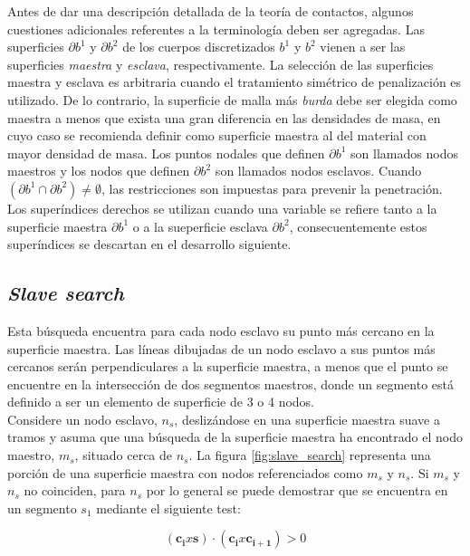 Antes de dar una descripción detallada de la teoría de contactos, algunos cuestiones adicionales 
referentes a la terminología deben ser agregadas. Las superficies $\partial b^1$ y $\partial b^2$ 
de los cuerpos discretizados $b^1$ y $b^2$ vienen a ser las superficies \textit{maestra} 
y \textit{esclava}, respectivamente. La selección de las superficies maestra y esclava es 
arbitraria cuando el tratamiento simétrico de penalización es utilizado. De lo contrario, 
la superficie de malla más \textit{burda} debe ser elegida como maestra a menos que 
exista una gran diferencia en las densidades de masa, en cuyo caso se recomienda definir 
como superficie maestra al del material con mayor densidad de masa. Los puntos nodales 
que definen $\partial b^1$ son llamados nodos maestros y los nodos que definen $\partial b^2$ 
son llamados nodos esclavos. Cuando $\left( \partial b^1 \cap \partial b^2 \right) \neq \emptyset$, 
las restricciones son impuestas para prevenir la penetración. Los superíndices derechos se 
utilizan cuando una variable se refiere tanto a la superficie maestra $\partial b^1$ o 
a la sueperficie esclava $\partial b^2$, consecuentemente estos superíndices se descartan 
en el desarrollo siguiente.

\subsection{\textit{Slave search}}

Esta búsqueda encuentra para cada nodo esclavo su punto más cercano en la superficie maestra. 
Las líneas dibujadas de un nodo esclavo a sus puntos más cercanos serán perpendiculares a la 
superficie maestra, a menos que el punto se encuentre en la intersección de dos segmentos 
maestros, donde un segmento está definido a ser un elemento de superficie de 3 o 4 nodos.\\

Considere un nodo esclavo, $n_s$, deslizándose en una superficie maestra suave a tramos y 
asuma que una búsqueda de la superficie maestra ha encontrado el nodo maestro, $m_s$, 
situado cerca de $n_s$. La figura \ref{fig:slave_search} representa una porción 
de una superficie maestra con nodos referenciados como $m_s$ y $n_s$. Si $m_s$ 
y $n_s$ no coinciden, para $n_s$ por lo general se puede demostrar que se encuentra 
en un segmento $s_1$  mediante el siguiente test:

\begin{equation}
(\mathbf{c_i} x \mathbf{s}) \cdot (\mathbf{c_i} x \mathbf{c_{i+1}}) > 0
\end{equation}

